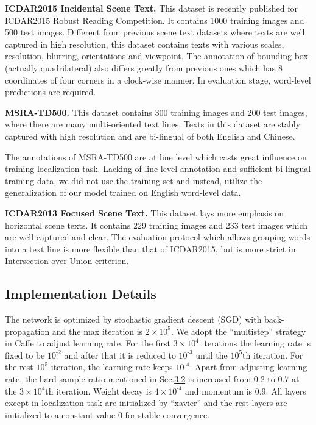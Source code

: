 \documentclass[10pt,twocolumn,letterpaper]{article}
\begin{document}
	\noindent \textbf{ICDAR2015 Incidental Scene Text.} This dataset is recently published for ICDAR2015 Robust Reading Competition. It contains 1000 training images and 500 test images. Different from previous scene text datasets where texts are well captured in high resolution, this dataset contains texts with various scales, resolution, blurring, orientations and viewpoint. 
	The annotation of bounding box (actually quadrilateral) also differs greatly from previous ones which has 8 coordinates of four corners in a clock-wise manner. 
	In evaluation stage, word-level predictions are required.
	
	
	\noindent \textbf{MSRA-TD500.} This dataset contains 300 training images and 200 test images, where there are many multi-oriented text lines. Texts in this dataset are stably captured with high resolution and are bi-lingual of both English and Chinese.
	
	The annotations of MSRA-TD500 are at line level which casts great influence on training localization task.
	Lacking of line level annotation and sufficient bi-lingual training data, we did not use the training set and instead, utilize the generalization of our model trained on English word-level data.
	
	\noindent \textbf{ICDAR2013 Focused Scene Text.} This dataset lays more emphasis on horizontal scene texts. It contains 229 training images and 233 test images which are well captured and clear.	The evaluation protocol which allows grouping words into a text line is more flexible than that of ICDAR2015, but is more strict in Intersection-over-Union criterion.
	
	\subsection{Implementation Details}
	\label{Sec.4.2}
	The network is optimized by stochastic gradient descent (SGD) with back-propagation and the max iteration is $2 \times 10^{5}$. We adopt the ``multistep'' strategy in Caffe \cite{caffe} to adjust learning rate. For the first $3 \times 10^{4}$ iterations the learning rate is fixed to be $10^{\text{-}2}$ and after that it is reduced to $10^{\text{-}3}$ until the $10^5$th iteration. For the rest $10^5$ iteration, the learning rate keeps $10^{\text{-}4}$. Apart from adjusting learning rate, the hard sample ratio mentioned in Sec.\hyperref[Sec.3.2]{3.2} is increased from 0.2 to 0.7 at the $3 \times 10^4$th iteration. Weight decay is $4 \times 10^{\text{-}4}$ and momentum is 0.9. All layers except in localization task are initialized by ``xavier'' \cite{glorot2010understanding} and the rest layers are initialized to a constant value 0 for stable convergence.
	
\end{document}

